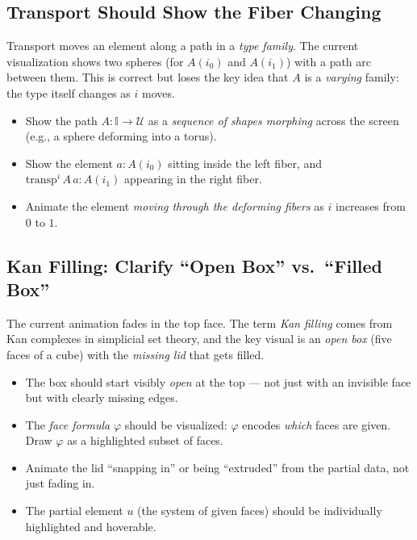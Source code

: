\documentclass[11pt, a4paper]{article}
\begin{document}
\subsection{Transport Should Show the Fiber Changing}

Transport moves an element along a path in a \emph{type family}. The current
visualization shows two spheres (for $A(i_0)$ and $A(i_1)$) with a path arc
between them. This is correct but loses the key idea that $A$ is a
\emph{varying} family: the type itself changes as $i$ moves.

\begin{itemize}
  \item Show the path $A : \mathbb{I} \to \mathcal{U}$ as a \emph{sequence of
    shapes morphing} across the screen (e.g., a sphere deforming into a torus).
  \item Show the element $a : A(i_0)$ sitting inside the left fiber, and
    $\mathrm{transp}^i\,A\,a : A(i_1)$ appearing in the right fiber.
  \item Animate the element \emph{moving through the deforming fibers} as $i$
    increases from $0$ to $1$.
\end{itemize}

\subsection{Kan Filling: Clarify ``Open Box'' vs.\ ``Filled Box''}

The current animation fades in the top face. The term \emph{Kan filling} comes from
Kan complexes in simplicial set theory, and the key visual is an \emph{open box}
(five faces of a cube) with the \emph{missing lid} that gets filled.

\begin{itemize}
  \item The box should start visibly \emph{open} at the top --- not just with an
    invisible face but with clearly missing edges.
  \item The \emph{face formula} $\varphi$ should be visualized: $\varphi$ encodes
    \emph{which} faces are given. Draw $\varphi$ as a highlighted subset of faces.
  \item Animate the lid ``snapping in'' or being ``extruded'' from the partial data,
    not just fading in.
  \item The partial element $u$ (the system of given faces) should be individually
    highlighted and hoverable.
\end{itemize}
\end{document}
